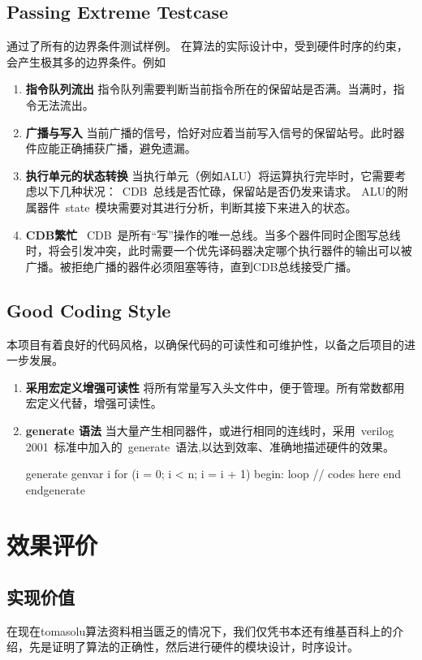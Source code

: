 \documentclass[twoside]{article}
\begin{document}
\subsection{Passing Extreme Testcase} 
通过了所有的边界条件测试样例。  
在算法的实际设计中，受到硬件时序的约束，会产生极其多的边界条件。例如
\begin{enumerate}
	\item \textbf{指令队列流出   }指令队列需要判断当前指令所在的保留站是否满。当满时，指令无法流出。
	\item \textbf{广播与写入   }当前广播的信号，恰好对应着当前写入信号的保留站号。此时器件应能正确捕获广播，避免遗漏。
	\item \textbf{执行单元的状态转换   }当执行单元（例如ALU）将运算执行完毕时，它需要考虑以下几种状况：~CDB~总线是否忙碌，保留站是否仍发来请求。  
	ALU的附属器件~state~模块需要对其进行分析，判断其接下来进入的状态。
	\item \textbf{CDB繁忙   }~CDB~是所有“写”操作的唯一总线。当多个器件同时企图写总线时，将会引发冲突，此时需要一个优先译码器决定哪个执行器件的输出可以被广播。被拒绝广播的器件必须阻塞等待，直到CDB总线接受广播。
\end{enumerate}

\subsection{Good Coding Style}
本项目有着良好的代码风格，以确保代码的可读性和可维护性，以备之后项目的进一步发展。
\begin{enumerate}
	\item \textbf{采用宏定义增强可读性  }将所有常量写入头文件中，便于管理。所有常数都用宏定义代替，增强可读性。
	\item \textbf{generate 语法  }当大量产生相同器件，或进行相同的连线时，采用~verilog 2001~标准中加入的~generate~语法,以达到效率、准确地描述硬件的效果。
    \begin{verilogcode}
        generate
            genvar i
            for (i = 0; i < n; i = i + 1) begin: loop
                // codes here
            end
        endgenerate
    \end{verilogcode}
\end{enumerate}

\section{效果评价}

\subsection{实现价值}
在现在tomasolu算法资料相当匮乏的情况下，我们仅凭书本还有维基百科上的介绍，先是证明了算法的正确性，然后进行硬件的模块设计，时序设计。
\end{document}
